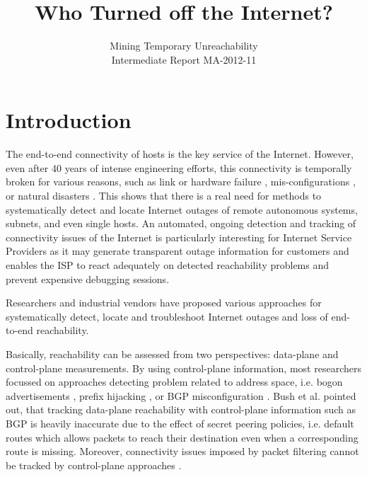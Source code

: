 \documentclass{sigcomm-alternate}
\begin{document}
 
\title{Who Turned off the Internet?} 
\subtitle{Mining Temporary Unreachability\\ \Large Intermediate Report MA-2012-11}

\author{ 
}

\maketitle 
\section{Introduction}
The end-to-end connectivity of hosts is the key service of the Internet.
However, even after 40 years of intense engineering efforts, this
connectivity is temporally broken for various reasons, such as link
or hardware failure \cite{Markopoulou:2008}, mis-configurations
\cite{Mahajan:2002}, or natural disasters
\cite{Dainotti:2012:EBH,Schulman:2011}.
This shows that there is a real need for methods to systematically
detect and locate Internet outages of remote autonomous systems,
subnets, and even single hosts. An automated, ongoing detection and
tracking of connectivity issues of the Internet is particularly
interesting for Internet Service Providers as it may generate
transparent outage information for customers and enables the ISP
to react adequately on detected reachability problems and prevent
expensive debugging sessions.

Researchers and industrial vendors have proposed various approaches
for systematically detect, locate and troubleshoot Internet outages
and loss of end-to-end reachability.

Basically, reachability can be assessed from two perspectives:
data-plane and control-plane measurements. By using control-plane
information, most researchers focussed on approaches detecting
problem related to address space, i.e. bogon advertisements
\cite{Feamster:2005}, prefix hijacking \cite{Zhang:2010},
or BGP misconfiguration \cite{Mahajan:2002}. Bush et
al.\cite{Bush:Optometry} pointed out, that tracking data-plane
reachability with control-plane information such as BGP is heavily
inaccurate due to the effect of secret peering policies, i.e. default
routes which allows packets to reach their destination even when a
corresponding route is missing.
Moreover, connectivity issues imposed by packet filtering cannot
be tracked by control-plane approaches \cite{Dainotti:2011:ACI}.
\end{document}
